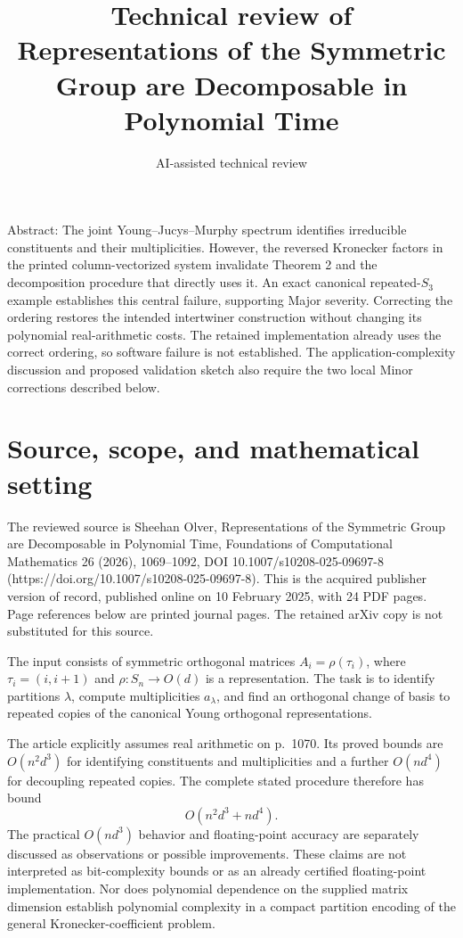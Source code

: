 \documentclass[10pt]{article}
\title{Technical review of
Representations of the Symmetric Group are Decomposable in Polynomial Time}
\author{AI-assisted technical review}
\date{}
\begin{document}
\maketitle
Abstract: The joint Young–Jucys–Murphy spectrum identifies irreducible constituents and their multiplicities. However, the reversed Kronecker factors in the printed column-vectorized system invalidate Theorem 2 and the decomposition procedure that directly uses it. An exact canonical repeated-\(S_3\) example establishes this central failure, supporting Major severity. Correcting the ordering restores the intended intertwiner construction without changing its polynomial real-arithmetic costs. The retained implementation already uses the correct ordering, so software failure is not established. The application-complexity discussion and proposed validation sketch also require the two local Minor corrections described below.\par
\section*{Source, scope, and mathematical setting}
The reviewed source is Sheehan Olver, Representations of the Symmetric Group are Decomposable in Polynomial Time, Foundations of Computational Mathematics 26 (2026), 1069–1092, DOI 10.1007/s10208-025-09697-8 (https://doi.org/10.1007/s10208-025-09697-8). This is the acquired publisher version of record, published online on 10 February 2025, with 24 PDF pages. Page references below are printed journal pages. The retained arXiv copy is not substituted for this source.\par
The input consists of symmetric orthogonal matrices \(A_i=\rho(\tau_i)\), where \(\tau_i=(i,i+1)\) and \(\rho:S_n\to O(d)\) is a representation. The task is to identify partitions \(\lambda\), compute multiplicities \(a_\lambda\), and find an orthogonal change of basis to repeated copies of the canonical Young orthogonal representations.\par
The article explicitly assumes real arithmetic on p. 1070. Its proved bounds are \(O(n^2d^3)\) for identifying constituents and multiplicities and a further \(O(nd^4)\) for decoupling repeated copies. The complete stated procedure therefore has bound \[O(n^2d^3+nd^4).\] The practical \(O(nd^3)\) behavior and floating-point accuracy are separately discussed as observations or possible improvements. These claims are not interpreted as bit-complexity bounds or as an already certified floating-point implementation. Nor does polynomial dependence on the supplied matrix dimension establish polynomial complexity in a compact partition encoding of the general Kronecker-coefficient problem.\par
\end{document}
